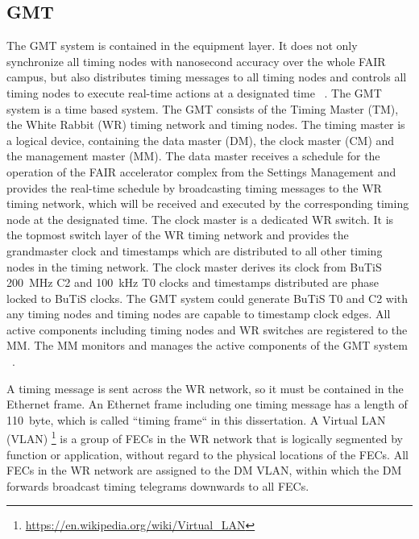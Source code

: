 \subsection{GMT}
The GMT system is contained in the equipment layer. It does not only synchronize all timing nodes with nanosecond accuracy over the whole FAIR campus, but also distributes timing messages to all timing nodes and controls all timing nodes to execute real-time actions at a designated time ~\cite{beck_new_2012}. The GMT system is a time based system. The GMT consists of the Timing Master (\gls{TM}), the White Rabbit (WR) timing network and timing nodes. The timing master is a logical device, containing the data master (\gls{DM}), the clock master (\gls{CM}) and the management master (\gls{MM}). The data master receives a schedule for the operation of the FAIR accelerator complex from the Settings Management and provides the real-time schedule by broadcasting timing messages to the WR timing network, which will be received and executed by the corresponding timing node at the designated time. The clock master is a dedicated WR switch. It is the topmost switch layer of the WR timing network and provides the grandmaster clock and timestamps which are distributed to all other timing nodes in the timing network. The clock master derives its clock from BuTiS \SI{200}{MHz} C2 and \SI{100}{kHz} T0 clocks and timestamps distributed are phase locked to BuTiS clocks. The GMT system could generate BuTiS T0 and C2 with any timing nodes and timing nodes are capable to timestamp clock edges. All active components including timing nodes and WR switches are registered to the MM. The MM monitors and manages the active components of the GMT system ~\cite{beck_general_????, beck_timing_2015}.

A timing message is sent across the WR network, so it must be contained in the Ethernet frame. An Ethernet frame including one timing message has a length of \SI{110}{byte}, which is called ``timing frame`` in this dissertation. A Virtual LAN (VLAN) \footnote{\url{https://en.wikipedia.org/wiki/Virtual_LAN}} is a group of FECs in the WR network that is logically segmented by function or application, without regard to the physical locations of the FECs. All FECs in the WR network are assigned to the DM VLAN, within which the DM forwards broadcast timing telegrams downwards to all FECs. 

